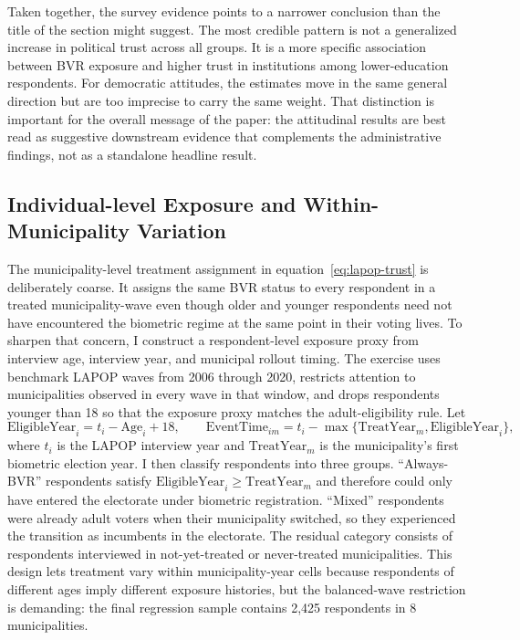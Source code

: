 Taken together, the survey evidence points to a narrower conclusion than the title of the section might suggest. The most credible pattern is not a generalized increase in political trust across all groups. It is a more specific association between BVR exposure and higher trust in institutions among lower-education respondents. For democratic attitudes, the estimates move in the same general direction but are too imprecise to carry the same weight. That distinction is important for the overall message of the paper: the attitudinal results are best read as suggestive downstream evidence that complements the administrative findings, not as a standalone headline result.

\subsection{Individual-level Exposure and Within-Municipality Variation}
\label{sec:lapop-individual-exposure}

The municipality-level treatment assignment in equation~\eqref{eq:lapop-trust} is deliberately coarse. It assigns the same BVR status to every respondent in a treated municipality-wave even though older and younger respondents need not have encountered the biometric regime at the same point in their voting lives. To sharpen that concern, I construct a respondent-level exposure proxy from interview age, interview year, and municipal rollout timing. The exercise uses benchmark LAPOP waves from 2006 through 2020, restricts attention to municipalities observed in every wave in that window, and drops respondents younger than 18 so that the exposure proxy matches the adult-eligibility rule. Let
\begin{equation}
\label{eq:lapop-individual-exposure}
\text{EligibleYear}_i = t_i - \text{Age}_i + 18,
\qquad
\text{EventTime}_{im} = t_i - \max\{\text{TreatYear}_m,\text{EligibleYear}_i\},
\end{equation}
where $t_i$ is the LAPOP interview year and $\text{TreatYear}_m$ is the municipality's first biometric election year. I then classify respondents into three groups. ``Always-BVR'' respondents satisfy $\text{EligibleYear}_i \geq \text{TreatYear}_m$ and therefore could only have entered the electorate under biometric registration. ``Mixed'' respondents were already adult voters when their municipality switched, so they experienced the transition as incumbents in the electorate. The residual category consists of respondents interviewed in not-yet-treated or never-treated municipalities. This design lets treatment vary within municipality-year cells because respondents of different ages imply different exposure histories, but the balanced-wave restriction is demanding: the final regression sample contains 2{,}425 respondents in 8 municipalities.

